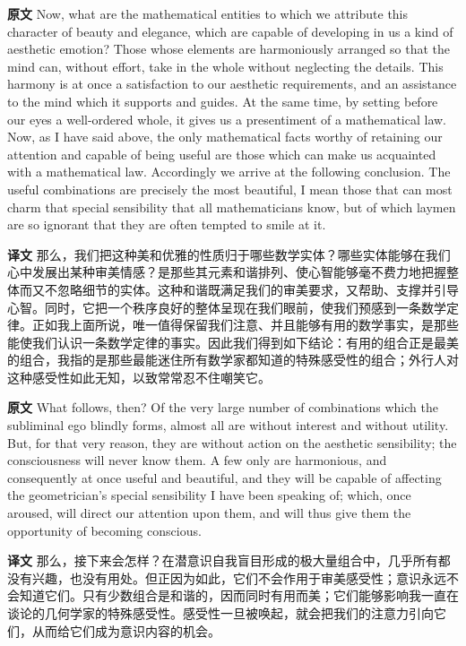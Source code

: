 \documentclass[UTF8,zihao=-4]{ctexart}
\newcommand{\BodyFont}{\fontsize{10.5pt}{15.5pt}\selectfont}
\newcommand{\origlabel}{\textbf{原文}\quad}
\newcommand{\translabel}{\textbf{译文}\quad}
\newenvironment{enblock}{\par\noindent\begingroup\BodyFont\origlabel}{\par\endgroup}
\newenvironment{zhblock}{\par\noindent\begingroup\BodyFont\translabel}{\par\endgroup\vspace{0.35em}}
\begin{document}
\begin{enblock}
Now, what are the mathematical entities to which we attribute this character of beauty and elegance, which are capable of developing in us a kind of aesthetic emotion? Those whose elements are harmoniously arranged so that the mind can, without effort, take in the whole without neglecting the details. This harmony is at once a satisfaction to our aesthetic requirements, and an assistance to the mind which it supports and guides. At the same time, by setting before our eyes a well-ordered whole, it gives us a presentiment of a mathematical law. Now, as I have said above, the only mathematical facts worthy of retaining our attention and capable of being useful are those which can make us acquainted with a mathematical law. Accordingly we arrive at the following conclusion. The useful combinations are precisely the most beautiful, I mean those that can most charm that special sensibility that all mathematicians know, but of which laymen are so ignorant that they are often tempted to smile at it.
\end{enblock}
\begin{zhblock}
那么，我们把这种美和优雅的性质归于哪些数学实体？哪些实体能够在我们心中发展出某种审美情感？是那些其元素和谐排列、使心智能够毫不费力地把握整体而又不忽略细节的实体。这种和谐既满足我们的审美要求，又帮助、支撑并引导心智。同时，它把一个秩序良好的整体呈现在我们眼前，使我们预感到一条数学定律。正如我上面所说，唯一值得保留我们注意、并且能够有用的数学事实，是那些能使我们认识一条数学定律的事实。因此我们得到如下结论：有用的组合正是最美的组合，我指的是那些最能迷住所有数学家都知道的特殊感受性的组合；外行人对这种感受性如此无知，以致常常忍不住嘲笑它。\end{zhblock}

\begin{enblock}
What follows, then? Of the very large number of combinations which the subliminal ego blindly forms, almost all are without interest and without utility. But, for that very reason, they are without action on the aesthetic sensibility; the consciousness will never know them. A few only are harmonious, and consequently at once useful and beautiful, and they will be capable of affecting the geometrician's special sensibility I have been speaking of; which, once aroused, will direct our attention upon them, and will thus give them the opportunity of becoming conscious.
\end{enblock}
\begin{zhblock}
那么，接下来会怎样？在潜意识自我盲目形成的极大量组合中，几乎所有都没有兴趣，也没有用处。但正因为如此，它们不会作用于审美感受性；意识永远不会知道它们。只有少数组合是和谐的，因而同时有用而美；它们能够影响我一直在谈论的几何学家的特殊感受性。感受性一旦被唤起，就会把我们的注意力引向它们，从而给它们成为意识内容的机会。\end{zhblock}
\end{document}
